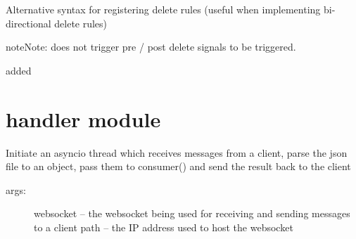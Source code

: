 \documentclass[letterpaper,10pt,english]{sphinxmanual}
\begin{document}
\begin{fulllineitems}
\begin{fulllineitems}
Alternative syntax for registering delete rules (useful when implementing
bi-directional delete rules)

\begin{sphinxVerbatim}[commandchars=\\\{\}]
 
      
      

  
\end{sphinxVerbatim}

\begin{sphinxadmonition}{note}{Note:}
 does not trigger pre / post delete signals to be
triggered.
\end{sphinxadmonition}

added 

\end{fulllineitems}


\end{fulllineitems}



\chapter{handler module}
\label{\detokenize{handler:module-handler}}\label{\detokenize{handler:handler-module}}\label{\detokenize{handler::doc}}

\begin{fulllineitems}
\label{\detokenize{handler:handler.handler}}
Initiate an asyncio thread which receives messages from a client, parse the json file to an object, pass them to consumer() and send the result back to the client
\begin{description}
\item[{args:}] \leavevmode
websocket -- the websocket being used for receiving and sending messages to a client
path -- the IP address used to host the websocket

\end{description}

\end{fulllineitems}
\end{document}
